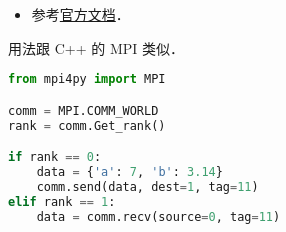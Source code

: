 
\begin{issues}
\issueDraft
\end{issues}

\begin{itemize}
\item 参考\href{https://mpi4py.readthedocs.io/en/stable/}{官方文档}．
\end{itemize}

用法跟 C++ 的 MPI 类似．

\begin{lstlisting}[language=python]
from mpi4py import MPI

comm = MPI.COMM_WORLD
rank = comm.Get_rank()

if rank == 0:
    data = {'a': 7, 'b': 3.14}
    comm.send(data, dest=1, tag=11)
elif rank == 1:
    data = comm.recv(source=0, tag=11)
\end{lstlisting}